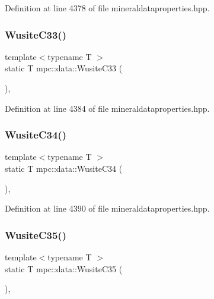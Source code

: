 Definition at line 4378 of file mineraldataproperties.\+hpp.

\mbox{\label{namespacempc_1_1data_abcf7e4264eb30118f66f7f0a32967ef4}} 
\subsubsection{\texorpdfstring{Wusite\+C33()}{WusiteC33()}}
{\footnotesize\ttfamily template$<$typename T $>$ \\
static T mpc\+::data\+::\+Wusite\+C33 (\begin{DoxyParamCaption}{ }\end{DoxyParamCaption})\hspace{0.3cm}{\ttfamily [inline]}, {\ttfamily [static]}}



Definition at line 4384 of file mineraldataproperties.\+hpp.

\mbox{\label{namespacempc_1_1data_a7d074c53b07a1cb7cc6e14acaa44d2a0}} 
\subsubsection{\texorpdfstring{Wusite\+C34()}{WusiteC34()}}
{\footnotesize\ttfamily template$<$typename T $>$ \\
static T mpc\+::data\+::\+Wusite\+C34 (\begin{DoxyParamCaption}{ }\end{DoxyParamCaption})\hspace{0.3cm}{\ttfamily [inline]}, {\ttfamily [static]}}



Definition at line 4390 of file mineraldataproperties.\+hpp.

\mbox{\label{namespacempc_1_1data_a821385997f4e474fe0f5c33d5c99c26f}} 
\subsubsection{\texorpdfstring{Wusite\+C35()}{WusiteC35()}}
{\footnotesize\ttfamily template$<$typename T $>$ \\
static T mpc\+::data\+::\+Wusite\+C35 (\begin{DoxyParamCaption}{ }\end{DoxyParamCaption})\hspace{0.3cm}{\ttfamily [inline]}, {\ttfamily [static]}}



